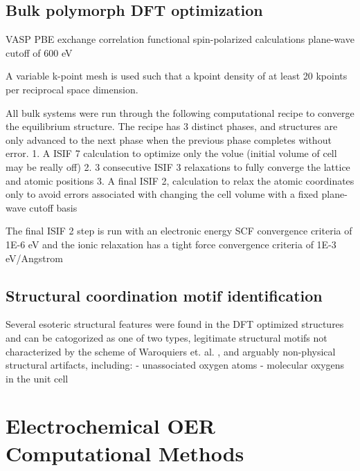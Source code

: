 \subsection{Bulk polymorph DFT optimization}
VASP
PBE exchange correlation functional
spin-polarized calculations
plane-wave cutoff of 600 eV

A variable k-point mesh is used such that a kpoint density of at least 20 kpoints per reciprocal space dimension.

All bulk systems were run through the following computational recipe to converge the equilibrium structure.
The recipe has 3 distinct phases, and structures are only advanced to the next phase when the previous phase completes without error.
1. A ISIF 7 calculation to optimize only the volue (initial volume of cell may be really off)
2. 3 consecutive ISIF 3 relaxations to fully converge the lattice and atomic positions
3. A final ISIF 2, calculation to relax the atomic coordinates only to avoid errors associated with changing the cell volume with a fixed plane-wave cutoff basis

The final ISIF 2 step is run with an electronic energy SCF convergence criteria of 1E-6 eV and the ionic relaxation has a tight force convergence criteria of 1E-3 eV/Angstrom

\subsection{Structural coordination motif identification}
Several esoteric structural features were found in the DFT optimized structures and can be catogorized as one of two types, legitimate structural motifs not characterized by the scheme of Waroquiers et. al. \cite{Waroquiers2017}, and arguably non-physical structural artifacts, including:
- unassociated oxygen atoms
- molecular oxygens in the unit cell
%



\section{Electrochemical OER Computational Methods}  %
%

